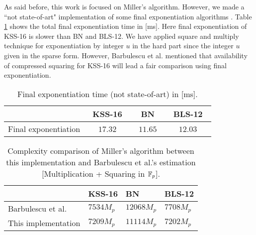 As said before, this work is focused on Miller's algorithm. However, we made a ``not state-of-art" implementation of some  final exponentiation algorithms \cite{EPRINT:GhaFou16b,SAC:FueKnaRod11,EPRINT:GhaFou16a}. 
Table \ref{com_fe} shows the total final exponentiation time in [ms].
Here final exponentiation of KSS-16 is slower than BN and BLS-12.  
We have applied square and multiply technique for exponentiation by integer $u$ in the hard part since the integer $u$ given in the sparse form.
However, Barbulescu et al. \cite{EPRINT:BarDuq17} mentioned that availability of compressed squaring \cite{EC:AKLGL11} for KSS-16 will lead a fair comparison using final exponentiation.
\renewcommand{\baselinestretch}{1.5}
\begin{table}[ht]
\centering
\caption{Final exponentiation time (not state-of-art) in [ms].}
\label{com_fe}
\begin{tabular}{l|c|c|c|}
\cline{2-4}
                                           & ~KSS-16~   & ~BN~       & ~BLS-12~   \\ \hline
\multicolumn{1}{|l|}{Final exponentiation} & ~$17.32 $~ & ~$11.65 $~ & ~$12.03 $~ \\ \hline
\end{tabular}
\end{table}
\renewcommand{\baselinestretch}{1.0}

\renewcommand{\baselinestretch}{1.5}
\begin{table}[ht]
	\centering
	\caption{Complexity comparison of Miller's algorithm between this implementation and Barbulescu et al.'s \cite{EPRINT:BarDuq17} estimation [Multiplication + Squaring in ${\mathbb{F}}_{p}$].}
	\label{com_com}
	\begin{tabular}{l|l|l|l|}
		\cline{2-4}
		& KSS-16     & BN          & BLS-12      \\ \hline
		\multicolumn{1}{|l|}{Barbulescu et al. \cite{EPRINT:BarDuq17}} & $ 7534 M_p$ & $12068 M_p$ & $7708 M_p$ \\ \hline
		\multicolumn{1}{|l|}{This implementation}         &     $7209 M_p$       &   $11114 M_p$          &        $7202 M_p$   \\ \hline
	\end{tabular}
\end{table}
\renewcommand{\baselinestretch}{1.0}

